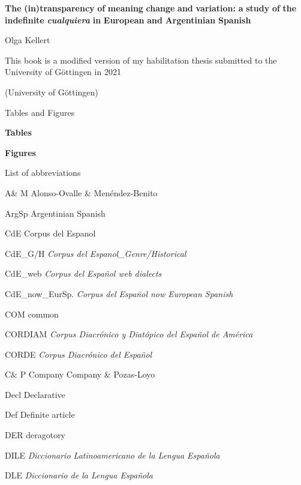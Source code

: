 

\textbf{The} \textbf{(in)transparency} \textbf{of} \textbf{meaning} \textbf{change} \textbf{and} \textbf{variation:} \textbf{a} \textbf{study} \textbf{of} \textbf{the} \textbf{indefinite} \textbf{\textit{cualquiera}} \textbf{in} \textbf{European} \textbf{and} \textbf{Argentinian} \textbf{Spanish}

Olga Kellert

This book is a modified version of my habilitation thesis submitted to the University of Göttingen in 2021

(University of Göttingen)

\begin{styleContentsHeading}
Tables and Figures
\end{styleContentsHeading}

\begin{styleelenconumeratoii}
\textbf{Tables}
\end{styleelenconumeratoii}

\begin{styleelenconumeratoii}
\textbf{Figures}
\end{styleelenconumeratoii}

\begin{styleContentsHeading}
List of abbreviations
\end{styleContentsHeading}

A\& M   Alonso-Ovalle \& Menéndez-Benito

ArgSp  Argentinian Spanish

CdE     Corpus del Espanol

CdE\_G/H  \textit{Corpus del Espanol\_Genre/Historical}

CdE\_web \textit{Corpus del Español web dialects}

CdE\_now\_EurSp.  \textit{Corpus del Español now European Spanish}

COM   common

CORDIAM   \textit{Corpus Diacrónico y Diatópico del Español de América}

CORDE   \textit{Corpus Diacrónico del Español}

C\& P    Company Company \& Pozas-Loyo

Decl    Declarative

Def    Definite article

DER     deragotory

DILE   \textit{Diccionario Latinoamericano de la Lengua Española}

DLE    \textit{Diccionario de la Lengua Española}

